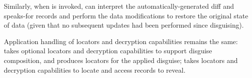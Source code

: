 Similarly, when  is invoked, \sys can interpret the automatically-generated diff and
speaks-for records and perform the data modifications to restore the original state of data (given
that no subsequent updates had been performed since disguising).

Application handling of locators and decryption capabilities remains the same: 
takes optional locators and decryption capabilities to support disguise composition, and produces
locators for the applied disguise;  takes locators and decryption capabilities to
locate and access records to reveal.

